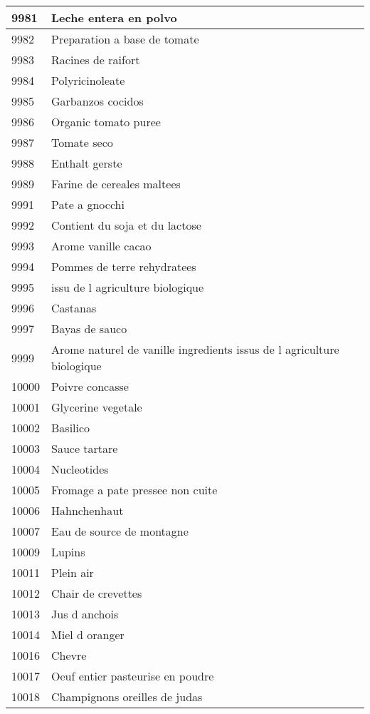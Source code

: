 \begin{longtable}{|l|l|}
9981 & Leche entera en polvo \\ \hline 
9982 & Preparation a base de tomate \\ \hline 
9983 & Racines de raifort \\ \hline 
9984 & Polyricinoleate \\ \hline 
9985 & Garbanzos cocidos \\ \hline 
9986 & Organic tomato puree \\ \hline 
9987 & Tomate seco \\ \hline 
9988 & Enthalt gerste \\ \hline 
9989 & Farine de cereales maltees \\ \hline 
9991 & Pate a gnocchi \\ \hline 
9992 & Contient du soja et du lactose \\ \hline 
9993 & Arome vanille cacao \\ \hline 
9994 & Pommes de terre rehydratees \\ \hline 
9995 &  issu de l agriculture biologique \\ \hline 
9996 & Castanas \\ \hline 
9997 & Bayas de sauco \\ \hline 
9999 & Arome naturel de vanille  ingredients issus de l agriculture biologique \\ \hline 
10000 & Poivre concasse \\ \hline 
10001 & Glycerine vegetale \\ \hline 
10002 & Basilico \\ \hline 
10003 & Sauce tartare \\ \hline 
10004 & Nucleotides \\ \hline 
10005 & Fromage a pate pressee non cuite \\ \hline 
10006 & Hahnchenhaut \\ \hline 
10007 & Eau de source de montagne \\ \hline 
10009 & Lupins \\ \hline 
10011 & Plein air \\ \hline 
10012 & Chair de crevettes \\ \hline 
10013 & Jus d anchois \\ \hline 
10014 & Miel d oranger \\ \hline 
10016 & Chevre \\ \hline 
10017 & Oeuf entier pasteurise en poudre \\ \hline 
10018 & Champignons oreilles de judas \\ \hline 

\end{longtable}
